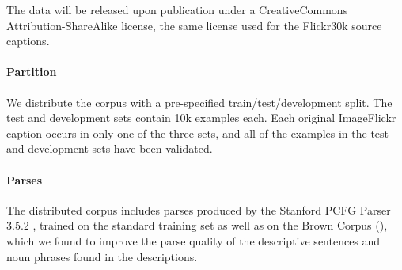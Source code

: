 The data will be released upon publication under a CreativeCommons
Attribution-ShareAlike license, the same license used for the Flickr30k source captions.


\paragraph{Partition} 

We distribute the corpus with a pre-specified train/test/development split. The test and development sets contain 10k examples each. Each original ImageFlickr caption occurs in only one of the three sets, and all of the examples in the test and development sets have been validated.

\paragraph{Parses}

The distributed corpus includes parses produced by the Stanford PCFG Parser 3.5.2 \cite{klein2003accurate}, trained on the standard training set as well as on the Brown Corpus (\citealt{francis1979brown}), which we found to improve the parse quality of the descriptive sentences and noun phrases found in the descriptions. 


